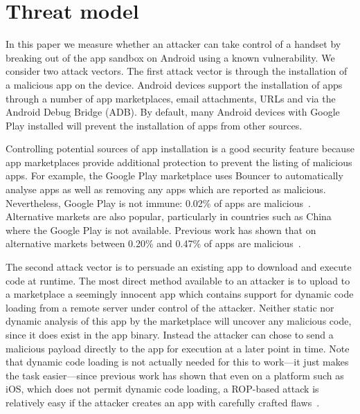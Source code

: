 \documentclass[conference,a4paper,twoside]{IEEEtran}
\begin{document}
\section{Threat model}
\label{sec:threatmodel}

In this paper we measure whether an attacker can take control of a handset by breaking out of the app sandbox on Android using a known vulnerability.
We consider two attack vectors.
The first attack vector is through the installation of a malicious app on the device.
Android devices support the installation of apps through a number of app marketplaces, email attachments, URLs and via the Android Debug Bridge (ADB).
By default, many Android devices with Google Play installed will prevent the installation of apps from other sources.

Controlling potential sources of app installation is a good security feature because app marketplaces provide additional protection to prevent the listing of malicious apps.
For example, the Google Play marketplace uses Bouncer to automatically analyse apps as well as removing any apps which are reported as malicious.
Nevertheless, Google Play is not immune: 0.02\% of apps are malicious~\cite{Zhou2012a}.
Alternative markets are also popular, particularly in countries such as China where the Google Play is not available. 
Previous work has shown that on alternative markets between 0.20\% and 0.47\% of apps are malicious~\cite{Zhou2012a}.

The second attack vector is to persuade an existing app to download and execute code at runtime.
The most direct method available to an attacker is to upload to a marketplace a seemingly innocent app which contains support for dynamic code loading from a remote server under control of the attacker.
Neither static nor dynamic analysis of this app by the marketplace will uncover any malicious code, since it does exist in the app binary.
Instead the attacker can chose to send a malicious payload directly to the app for execution at a later point in time. Note that dynamic code loading is not actually needed for this to work---it just makes the task easier---since previous work has shown that even on a platform such as iOS, which does not permit dynamic code loading, a ROP-based attack is relatively easy if the attacker creates an app with carefully crafted flaws~\cite{}.
\end{document}
